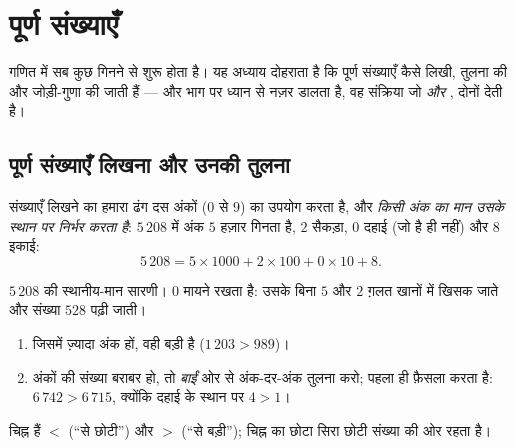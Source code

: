 \chapter{पूर्ण संख्याएँ}\label{ch:g6:wholes}

गणित में सब कुछ गिनने से शुरू होता है। यह अध्याय दोहराता है कि
पूर्ण संख्याएँ कैसे लिखी, तुलना की और जोड़ी-गुणा की जाती हैं ---
और भाग पर ध्यान से नज़र डालता है, वह संक्रिया जो 
\emph{और} , दोनों देती है।

\section{पूर्ण संख्याएँ लिखना और उनकी तुलना}

\begin{definition}[स्थानीय मान]\label{def:g6:wholes:place}
संख्याएँ लिखने का हमारा ढंग दस अंकों ($0$ से $9$) का उपयोग करता
है, और \emph{किसी अंक का मान उसके स्थान पर निर्भर करता
है}: $5\,208$ में अंक $5$ हज़ार गिनता है, $2$
सैकड़ा, $0$ दहाई (जो है ही नहीं) और $8$ इकाई:
\[
5\,208 = 5 \times 1000 + 2 \times 100 + 0 \times 10 + 8 .
\]
\end{definition}

\begin{omfigure}

{\small $5\,208$ की स्थानीय-मान सारणी। $0$ मायने रखता है: उसके
बिना $5$ और $2$ ग़लत खानों में खिसक जाते और संख्या $528$ पढ़ी
जाती।}
\end{omfigure}

\begin{method}[दो पूर्ण संख्याओं की तुलना]\label{met:g6:wholes:compare}
\begin{enumerate}
  \item जिसमें ज़्यादा अंक हों, वही बड़ी है
        ($1\,203 > 989$)।
  \item अंकों की संख्या बराबर हो, तो \emph{बाईं} ओर से
        अंक-दर-अंक तुलना करो; पहला  ही फ़ैसला करता है:
        $6\,742 > 6\,715$, क्योंकि दहाई के स्थान पर $4 > 1$।
\end{enumerate}
चिह्न हैं $<$ (``से छोटी'') और $>$ (``से बड़ी''); चिह्न का छोटा
सिरा छोटी संख्या की ओर रहता है।
\end{method}

